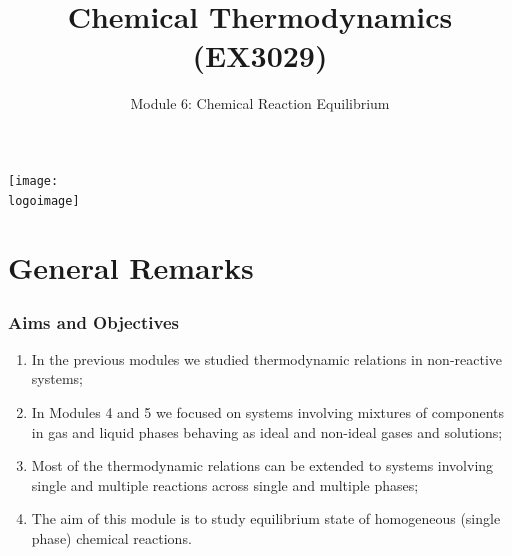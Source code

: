 \documentclass[10pt,compress,handout,unknownkeysallowed]{beamer}
\institute{School of Engineering}
\title{Chemical Thermodynamics (EX3029)}
\subtitle{Module 6: Chemical Reaction Equilibrium}
\date[ ]{ }
\newcommand{\logoimage}{../../FigBanner/UoAHorizBanner}
\begin{document}
\begin{frame}
  \titlepage
  \vfill%
  \begin{center}
    \texttt{[image: \\logoimage]}
  \end{center}
\end{frame}




\section{General Remarks}

\begin{frame}
 \frametitle{Aims and Objectives}
   \begin{enumerate}
     \item<1-> In the previous modules we studied thermodynamic relations in non-reactive systems;
     \item<1-> In Modules 4 and 5 we focused on systems involving mixtures of components in gas and liquid phases behaving as ideal and non-ideal gases and solutions;
     \item<2-> Most of the thermodynamic relations can be extended to systems involving single and multiple reactions across single and multiple phases;
     \item<2-> The aim of this module is to study equilibrium state of homogeneous (\ie single phase) chemical reactions.
   \end{enumerate}
\end{frame}


\end{document}
